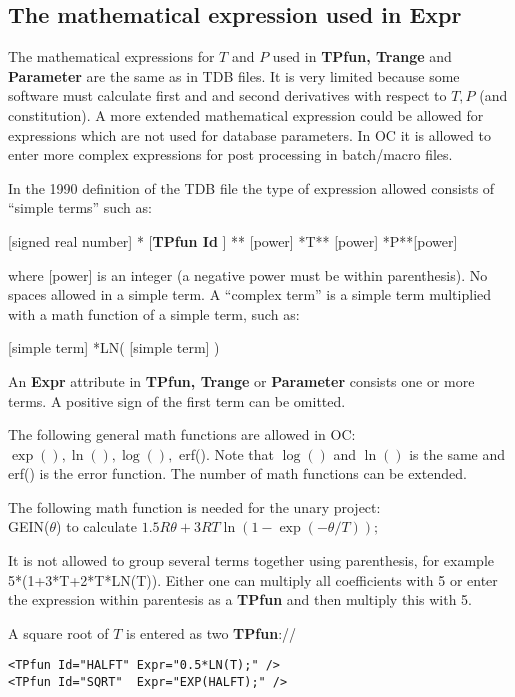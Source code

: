 \documentclass{article}
\begin{document}
\newpage 

\subsection{The mathematical expression used in Expr}\label{sec:expr}

The mathematical expressions for $T$ and $P$ used in {\bf TPfun,
  Trange} and {\bf Parameter} are the same as in TDB files.  It is
very limited because some software must calculate first and and second
derivatives with respect to $T, P$ (and constitution).  A more
extended mathematical expression could be allowed for expressions
which are not used for database parameters.  In OC it is allowed to
enter more complex expressions for post processing in batch/macro
files.

In the 1990 definition of the TDB file the type of expression allowed
consists of ``simple terms'' such as:

[signed real number] * [{\bf TPfun Id} ] ** [power] *T** [power] *P**[power]

where [power] is an integer (a negative power must be within
parenthesis).  No spaces allowed in a simple term.  A ``complex term''
is a simple term multiplied with a math function of a simple term,
such as:

[simple term] *LN( [simple term] )

An {\bf Expr} attribute in {\bf TPfun, Trange} or {\bf Parameter}
consists one or more terms.  A positive sign of the first term can be
omitted.
  
The following general math functions are allowed in OC:\\ $\exp(),
\ln(), \log(),$ erf().  Note that $\log()$ and $\ln()$ is the same and
erf() is the error function.  The number of math functions can be
extended.

The following math function is needed for the unary
project:\\ GEIN($\theta$) to calculate
$1.5R\theta+3RT\ln(1-\exp(-\theta/T));$

It is not allowed to group several terms together using parenthesis,
for example 5*(1+3*T+2*T*LN(T)).  Either one can multiply all
coefficients with 5 or enter the expression within parentesis as a
{\bf TPfun} and then multiply this with 5.

A square root of $T$ is entered as two {\bf TPfun}://
\begin{verbatim}
<TPfun Id="HALFT" Expr="0.5*LN(T);" />
<TPfun Id="SQRT"  Expr="EXP(HALFT);" />
\end{verbatim}
\end{document}
